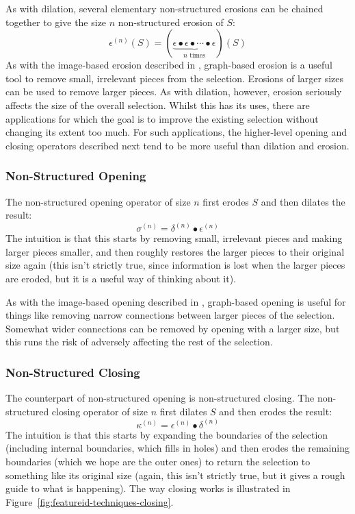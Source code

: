 As with dilation, several elementary non-structured erosions can be chained together to give the size $n$ non-structured erosion of $S$:
%
\[
\epsilon^{(n)}(S) = (\underbrace{\epsilon \bullet \epsilon \bullet \cdots \bullet \epsilon}_{n \mbox{ times}})(S)
\]
%
As with the image-based erosion described in \cite{gonzalez02}, graph-based erosion is a useful tool to remove small, irrelevant pieces from the selection. Erosions of larger sizes can be used to remove larger pieces. As with dilation, however, erosion seriously affects the size of the overall selection. Whilst this has its uses, there are applications for which the goal is to improve the existing selection without changing its extent too much. For such applications, the higher-level opening and closing operators described next tend to be more useful than dilation and erosion.

\subsubsection{Non-Structured Opening}

The non-structured opening operator of size $n$ first erodes $S$ and then dilates the result:
%
\[
\sigma^{(n)} = \delta^{(n)} \bullet \epsilon^{(n)}
\]
%
The intuition is that this starts by removing small, irrelevant pieces and making larger pieces smaller, and then roughly restores the larger pieces to their original size again (this isn't strictly true, since information is lost when the larger pieces are eroded, but it is a useful way of thinking about it).

As with the image-based opening described in \cite{gonzalez02}, graph-based opening is useful for things like removing narrow connections between larger pieces of the selection. Somewhat wider connections can be removed by opening with a larger size, but this runs the risk of adversely affecting the rest of the selection.

\subsubsection{Non-Structured Closing}

The counterpart of non-structured opening is non-structured closing. The non-structured closing operator of size $n$ first dilates $S$ and then erodes the result:
%
\[
\kappa^{(n)} = \epsilon^{(n)} \bullet \delta^{(n)}
\]
%
The intuition is that this starts by expanding the boundaries of the selection (including internal boundaries, which fills in holes) and then erodes the remaining boundaries (which we hope are the outer ones) to return the selection to something like its original size (again, this isn't strictly true, but it gives a rough guide to what is happening). The way closing works is illustrated in Figure~\ref{fig:featureid-techniques-closing}.

